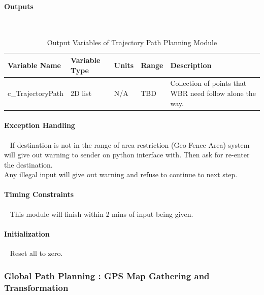 \documentclass[12pt]{article}
\begin{document}
            \paragraph{Outputs}
                ~\newline
                \begin{table}[H]
                  \centering
                    \caption{Output Variables of Trajectory Path Planning Module} \label{tbl:Output Variables of Trajectory Path Planning Module}
                  \begin{tabularx}{\textwidth}{|p{5cm}|p{1.2cm}|p{1.2cm}|p{1cm}|X|}
                    \hline Variable Name & Variable Type & Units & Range & Description \\
                    \hline c\_TrajectoryPath & 2D list &  N/A & TBD & Collection of points that WBR need follow alone the way.\\
                    \hline
                  \end{tabularx}
                \end{table}
                
            \paragraph{Exception Handling}
                ~\newline
                If destination is not in the range of area restriction (Geo Fence Area) system will give out warning to sender on python interface with. Then ask for re-enter the destination. \\
                Any illegal input will give out warning and refuse to continue to next step.    
            \paragraph{Timing Constraints}
                ~\newline
                This module will finish within 2 mins of input being given. 
            \paragraph{Initialization}
                ~\newline
                Reset all to zero.
        \newpage
        
        \subsubsection{Global Path Planning : GPS Map Gathering and Transformation}
\end{document}
